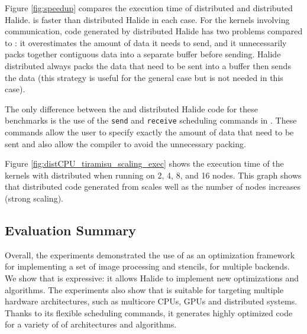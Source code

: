 Figure \ref{fig:speedup} compares the execution time of distributed \framework{} and distributed Halide. \framework{} is faster than distributed Halide in each case. For the kernels involving communication, code generated by distributed Halide has two problems compared to \framework{}:  it overestimates the amount of data it needs to send, and it unnecessarily packs together contiguous data into a separate buffer before sending.  Halide distributed always packs the data that need to be sent into a buffer then sends the data (this strategy is useful for the general case but is not needed in this case).

The only difference between the \framework{} and distributed Halide code for these benchmarks is the use of the \texttt{send} and \texttt{receive} scheduling commands in \framework{}.  These commands allow the user to specify exactly the amount of data that need to be sent and also allow the compiler to avoid the unnecessary packing.

Figure \ref{fig:distCPU_tiramisu_scaling_exec} shows the execution time of the kernels with distributed \framework{} when running on 2, 4, 8, and 16 nodes.  This graph shows that distributed code generated from \framework{} scales well as the number of nodes increases (strong scaling).

\vspace{-0.25cm}
\subsection{Evaluation Summary}

Overall, the experiments demonstrated the use of \framework as an optimization framework for implementing a set of image processing and stencils, for multiple backends.  We show that \framework{} is expressive: it allows Halide to implement new optimizations and algorithms.  The experiments also show that \framework{} is suitable for targeting multiple hardware architectures, such as multicore CPUs, GPUs and distributed systems. Thanks to its flexible scheduling commands, it generates highly optimized code for a variety of of architectures and algorithms.
